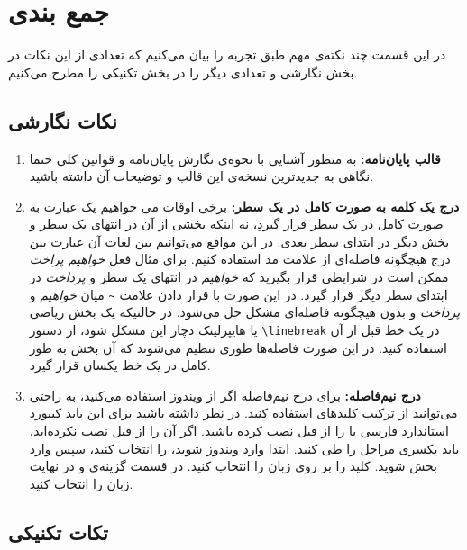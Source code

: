 \chapter{جمع بندی}
در این قسمت چند نکته‌ی مهم طبق تجربه را بیان می‌کنیم که تعدادی از این نکات در بخش نگارشی و تعدادی دیگر را در بخش تکنیکی را مطرح می‌کنیم. 

\section{نکات نگارشی}
\begin{enumerate}
	\item \textbf{قالب
		پایان‌نامه:} به منظور آشنایی با نحوه‌ی نگارش پایان‌نامه و قوانین کلی حتما نگاهی به جدید‌ترین نسخه‌ی این قالب و توضیحات آن داشته باشید. 
	\item \textbf{درج یک کلمه به صورت کامل در یک سطر:}
	برخی اوقات می خواهیم یک عبارت به صورت کامل در یک سطر قرار گیردِ، نه اینکه بخشی از آن در انتهای یک سطر و بخش دیگر در ابتدای سطر بعدی. در این مواقع می‌توانیم بین لغات آن عبارت بین درج هیچگونه فاصله‌ای از علامت مد استفاده کنیم. برای مثال  فعل 
	\textit{خواهیم پراخت}
	ممکن است در شرایطی قرار بگیرید که 
	\textit{خواهیم} 
	 در انتهای یک سطر و 
	 \textit{پرداخت}
	 در ابتدای سطر دیگر قرار گیرد. در این صورت با قرار دادن علامت 
	 \verb|~| 
	 میان 
	 \textit{خواهیم} 
	 و 
	 \textit{پرداخت}
	 و بدون هیچگونه فاصله‌ای مشکل حل می‌شود. در حالتیکه یک بخش ریاضی یا هایپرلینک دچار این مشکل شود، از دستور 
	 \verb*|\linebreak| 
	 در یک خط قبل از آن استفاده کنید. در این صورت فاصله‌ها طوری تنظیم می‌شوند که آن بخش به طور کامل در یک خط یکسان قرار گیرد. 
	
	\item \textbf{درج نیم‌فاصله:}
	برای درج نیم‌فاصله اگر از ویندوز استفاده می‌کنید، به راحتی می‌توانید از ترکیب کلید‌های‌ 
	استفاده کنید. در نظر داشته باشید برای این باید کیبورد استاندارد فارسی یا 
	را از قبل نصب کرده باشید. اگر آن را از قبل نصب نکرده‌اید، باید یکسری مراحل را طی کنید. ابتدا وارد 
	ویندوز شوید، 
	را انتخاب کنید، سپس وارد بخش 
	شوید.  کلید 
	را بر روی زبان 
	را انتخاب کنید. در قسمت 
	گزینه‌ی 
	و در نهایت زبان 
	را انتخاب کنید. 
\end{enumerate}	

\section{تکات تکنیکی}
	
